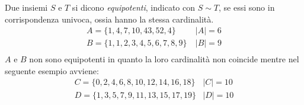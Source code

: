 Due insiemi $S$ e $T$ si dicono \textit{equipotenti}, indicato con $S \sim T$, se
essi sono in corrispondenza univoca, ossia hanno la stessa cardinalità.
\begin{equation*}
\begin{split}
A = \{ 1,4,7,10,43,52,4 \} & \ |A| = 6 \\
B = \{1,1,2,3,4,5,6,7,8,9 \} & \ |B| = 9 \\
\end{split}
\end{equation*}
$A$ e $B$ non sono equipotenti in quanto la loro cardinalità non coincide mentre
nel seguente esempio avviene:
\begin{equation*}
\begin{split}
C = \{0,2,4,6,8,10,12,14,16,18\} & |C| = 10 \\
D = \{1,3,5,7,9,11,13,15,17,19\} & |D| = 10 \\
\end{split}
\end{equation*}
